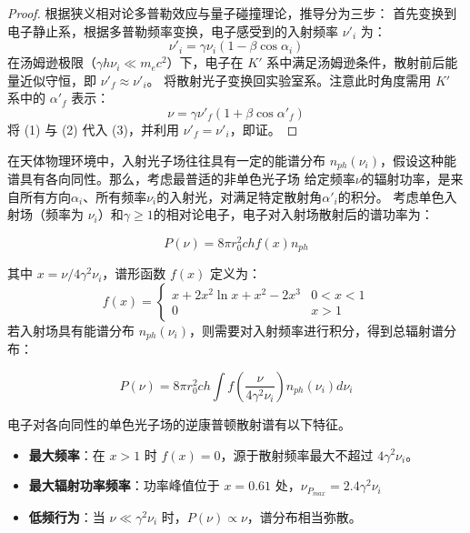\begin{proof}
根据狭义相对论多普勒效应与量子碰撞理论，推导分为三步：
首先变换到电子静止系，根据多普勒频率变换，电子感受到的入射频率 $\nu'_i$ 为：
    \begin{equation}
        \nu'_i = \gamma \nu_i (1 - \beta \cos \alpha_i)
    \end{equation}
    在汤姆逊极限（$\gamma h\nu_i \ll m_e c^2$）下，电子在 $K'$ 系中满足汤姆逊条件，散射前后能量近似守恒，即 $\nu'_f \approx \nu'_i$。
    将散射光子变换回实验室系。注意此时角度需用 $K'$ 系中的 $\alpha'_f$ 表示：
    \begin{equation}
        \nu = \gamma \nu'_f (1 + \beta \cos \alpha'_f)
    \end{equation}
将 (1) 与 (2) 代入 (3)，并利用 $\nu'_f = \nu'_i$，即证。
\end{proof}
在天体物理环境中，入射光子场往往具有一定的能谱分布 $n_{ph}(\nu_i)$，假设这种能谱具有各向同性。那么，考虑最普适的非单色光子场
给定频率$\nu$的辐射功率，是来自所有方向$\alpha_i$、所有频率$\nu_i$的入射光，对满足特定散射角$\alpha'_i$的积分。
考虑单色入射场（频率为 $\nu_i$）和$\gamma \geq 1$的相对论电子，电子对入射场散射后的谱功率为：
\begin{tcolorbox}[colframe=black, colback=white, boxrule=0.5pt, arc=0pt]
\begin{equation}
    P(\nu) = 8\pi r_0^2 c h f(x) n_{ph}
\end{equation}
\end{tcolorbox}
其中 $x = \nu / 4\gamma^2 \nu_i$，谱形函数 $f(x)$ 定义为：
\begin{equation}
    f(x) = \begin{cases} x + 2x^2 \ln x + x^2 - 2x^3 & 0 < x < 1 \\ 0 & x > 1 \end{cases}
\end{equation}
若入射场具有能谱分布 $n_{ph}(\nu_i)$，则需要对入射频率进行积分，得到总辐射谱分布：
\begin{tcolorbox}[colframe=black, colback=white, boxrule=0.5pt, arc=0pt]
\begin{equation}
    P(\nu) = 8\pi r_0^2 c h \int f\left(\frac{\nu}{4\gamma^2 \nu_i}\right) n_{ph}(\nu_i) d\nu_i
\end{equation}
\end{tcolorbox}
电子对各向同性的单色光子场的逆康普顿散射谱有以下特征。
\begin{itemize}
    \item \textbf{最大频率}：在 $x>1$ 时 $f(x)=0$，源于散射频率最大不超过 $4\gamma^2 \nu_i$。
    \item \textbf{最大辐射功率频率}：功率峰值位于 $x=0.61$ 处，$\nu_{P_{max}} = 2.4 \gamma^2 \nu_i$
    \item \textbf{低频行为}：当 $\nu \ll \gamma^2 \nu_i$ 时，$P(\nu) \propto \nu$，谱分布相当弥散。
\end{itemize}
